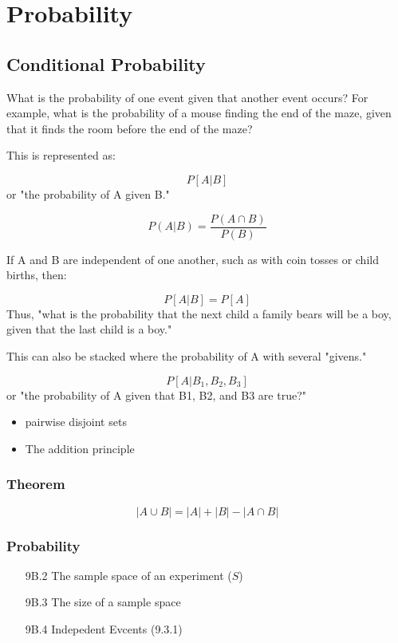 \documentclass[12pt]{report}
\begin{document}
\chapter{Probability}
\Large
\section{Conditional Probability}
What is the probability of one event given that another event occurs? For example, what is the probability of a mouse finding the end of the maze, given that it finds the room before the end of the maze?

This is represented as:


\[P[A | B]\]
or "the probability of A given B."

\[P(A | B) = \frac{P(A\cap B)}{P(B)}\]

If A and B are independent of one another, such as with coin tosses or child births, then:


\[P[A | B] = P[ A ]\]
Thus, "what is the probability that the next child a family bears will be a boy, given that the last child is a boy."

This can also be stacked where the probability of A with several "givens."


\[P[A | B_1, B_2, B_3 ]\]
or "the probability of A given that B1, B2, and B3 are true?"


		
		\begin{itemize}
			\item pairwise disjoint sets
			\item The addition principle
		\end{itemize}
		\subsection*{Theorem}
		\[ |A \cup B| = |A| + |B| - |A \cap B|  \]
		
		\subsection*{Probability}
		\begin{itemize}
			\item[9B.2] The sample space of an experiment ($S$)
			\item[9B.3] The size of a sample space
			\item[9B.4] Indepedent Evcents (9.3.1)
		\end{itemize}
		
\end{document}
